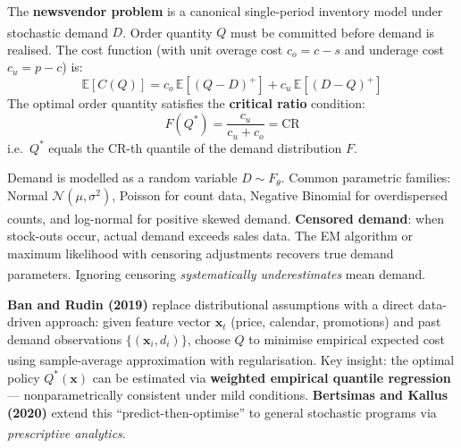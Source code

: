 \begin{tcbitemize}[ skin=sectionraster ]

    \tcbitem[title=Classic Single-Period Newsvendor, raster multicolumn=3]
    The \textbf{newsvendor problem} is a canonical single-period inventory model under stochastic demand $D$\textsuperscript{\cite[][pp.~537--541]{hillierIntroductionOperationsResearch2020}}.
    Order quantity $Q$ must be committed before demand is realised.
    The cost function (with unit overage cost $c_o = c - s$ and underage cost $c_u = p - c$) is:
    \begin{equation}
        \mathbb{E}[C(Q)] = c_o\,\mathbb{E}[(Q-D)^+] + c_u\,\mathbb{E}[(D-Q)^+]
    \end{equation}
    The optimal order quantity satisfies the \textbf{critical ratio} condition:
    \begin{equation}
        F(Q^*) = \frac{c_u}{c_u + c_o} = \text{CR}
    \end{equation}
    i.e.\ $Q^*$ equals the $\text{CR}$-th quantile of the demand distribution $F$.

    \tcbitem[title=Demand Models and Censoring, raster multicolumn=3]
    Demand is modelled as a random variable $D \sim F_\theta$. Common parametric families: Normal $\mathcal{N}(\mu,\sigma^2)$, Poisson for count data, Negative Binomial for overdispersed counts, and log-normal for positive skewed demand\textsuperscript{\cite[][p.~540]{hillierIntroductionOperationsResearch2020}}.
    \textbf{Censored demand}: when stock-outs occur, actual demand exceeds sales data. The EM algorithm or maximum likelihood with censoring adjustments recovers true demand parameters\textsuperscript{\cite[][pp.~490--495]{porteusFundamentationsStochasticInventory2002}}.
    Ignoring censoring \emph{systematically underestimates} mean demand.

    \tcbitem[title=Data-Driven Newsvendor (Ban \& Rudin), raster multicolumn=6]
    \textbf{Ban and Rudin (2019)} replace distributional assumptions with a direct data-driven approach: given feature vector $\mathbf{x}_t$ (price, calendar, promotions) and past demand observations $\{(\mathbf{x}_i, d_i)\}$, choose $Q$ to minimise empirical expected cost using sample-average approximation with regularisation\textsuperscript{\cite[][pp.~90--108]{banBigDataNewsvendor2019}}.
    Key insight: the optimal policy $Q^*(\mathbf{x})$ can be estimated via \textbf{weighted empirical quantile regression} --- nonparametrically consistent under mild conditions.
    \textbf{Bertsimas and Kallus (2020)} extend this ``predict-then-optimise'' to general stochastic programs via \emph{prescriptive analytics}\textsuperscript{\cite[][pp.~1025--1044]{bertsimasPredictivePrescriptiveAnalytics2020}}.

\end{tcbitemize}

